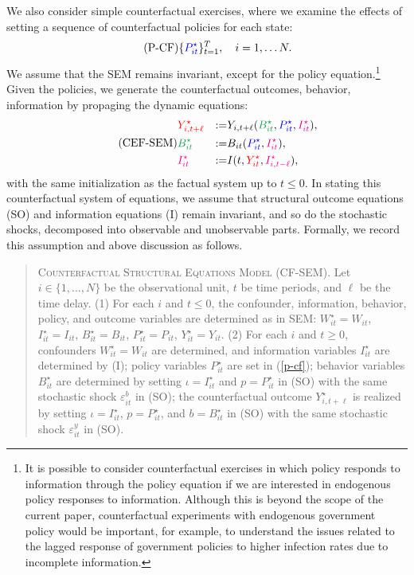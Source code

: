 \documentclass[11pt,reqno,letter]{amsart}
\theoremstyle{definition}
\def\bcolor{\color{ForestGreen}}
\def\pcolor{\color{blue}}
\def\icolor{\color{magenta}}
\def\ycolor{\color{red}}
\begin{document}
We  also consider simple counterfactual exercises, where we examine the effects of setting
a sequence of counterfactual policies for each state:
\begin{equation} \label{p-cf}\tag{P-CF}
\{{\pcolor P^\star_{it}} \}_{t=1}^T, \quad i=1, \ldots N.
\end{equation}
We assume that the SEM remains invariant, except for the policy equation.\footnote{It is possible to consider counterfactual exercises in which policy  responds to information through the policy equation if we are interested in endogenous policy responses to information. Although this is beyond the scope of the current paper, counterfactual experiments with endogenous government policy would be important, for example, to understand the issues related to the lagged response of government policies to higher infection rates due to incomplete information. } Given the policies, we generate the counterfactual
outcomes, behavior, information by propaging the dynamic equations:
\begin{equation} \label{eqn:CF-SEM} \tag{CEF-SEM}
  \begin{aligned}
& {\ycolor Y^\star_{i,t+\ell}}  & := & Y_{i,t+\ell} ( {\bcolor B^\star_{it} } , {\pcolor P^\star_{it}}, {\icolor I^\star_{it}}), \\
& {\bcolor B^\star_{it} } & := &   B_{it}({\pcolor P^\star_{it} } ,{\icolor I^\star_{it}}), \\
& {\icolor I^\star_{it} }& := &  I ({ t,  {\ycolor Y^\star_{it}}, \icolor I^\star_{i,t-\ell}}),  \end{aligned}
\end{equation}
with the same initialization as the factual system up to $t \leq 0$. In stating this counterfactual system of equations, we assume that structural outcome equations (SO) and information equations (I) remain invariant, and so do the stochastic shocks, decomposed
into observable and unobservable parts. Formally, we record this assumption and above discussion as follows.

\begin{quote}
\textsc{Counterfactual Structural Equations Model (CF-SEM)}.  Let $i \in \{1,..., N\}$ be the observational unit, $t$ be time periods, and $\ell$ be the time delay. (1) For each $i$ and $t \leq 0$, the confounder, information, behavior, policy, and outcome variables are determined as in SEM: $W^\star_{it}= W_{it}$, $I^\star_{it}= I_{it}$,  $B^\star_{it} = B_{it}$, $P^\star_{it}=P_{it}$, $Y^\star_{it} =Y_{it}$.  (2) For each $i$ and $t \geq 0$, confounders $W^\star_{it} =W_{it}$ are determined, and information variables $I^\star_{it}$ are determined  by (I);  policy variables $P^\star_{it}$ are set in (\ref{p-cf}); behavior variables $B^\star_{it}$ are determined by setting $\iota = I^\star_{it}$ and $p= P^\star_{it}$ in  (SO) with  the same stochastic shock $\varepsilon^b_{it}$ in (SO); the  counterfactual outcome $Y^\star_{i, t + \ell}$ is realized by setting $\iota = I^\star_{it}$, $p= P^\star_{it}$, and $b = B^\star_{it}$ in  (SO) with the same stochastic shock $\varepsilon^y_{it}$ in  (SO).
\end{quote}
\end{document}
